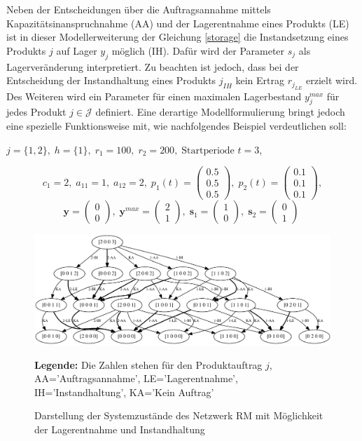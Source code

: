 Neben der Entscheidungen über die Auftragsannahme mittels Kapazitätsinanspruchnahme (AA) und der Lagerentnahme eines Produkts (LE) ist in dieser Modellerweiterung der Gleichung \eqref{storage} die Instandsetzung eines Produkts $j$ auf Lager $y_{j}$ möglich (IH). Dafür wird der Parameter $s_{j}$ als Lagerveränderung interpretiert. Zu beachten ist jedoch, dass bei der Entscheidung der Instandhaltung eines Produkts $j_{IH}$ kein Ertrag $r_{j_{LE}}$ erzielt wird. Des Weiteren wird ein Parameter für einen maximalen Lagerbestand $y_{j}^{max}$ für jedes Produkt $j\in\mathcal{J}$ definiert. Eine derartige Modellformulierung bringt jedoch eine spezielle Funktionsweise mit, wie nachfolgendes Beispiel verdeutlichen soll:
\begin{center}
$j = \{1, 2\}, \; h = \{1\}, \; r_{1} = 100, \; r_{2} = 200, \; \text{Startperiode } t=3$,
\end{center}
\[
    c_{1}=2, \;
    a_{11}=1, \;
     a_{12}=2, \;
     p_{1}(t)=\begin{pmatrix} 0.5\\ 0.5\\ 0.5  \end{pmatrix}, \;
     p_{2}(t)=\begin{pmatrix} 0.1\\ 0.1\\ 0.1  \end{pmatrix},
  \]
  \[
    \textbf{y}=\begin{pmatrix} 0 \\ 0 \end{pmatrix}, \;
    \textbf{y}^{max}=\begin{pmatrix} 2 \\ 1 \end{pmatrix}, \;
    \textbf{s}_1=\begin{pmatrix} 1 \\ 0 \end{pmatrix}, \;
     \textbf{s}_2=\begin{pmatrix} 0 \\ 1 \end{pmatrix} \;
  \]
\begin{figure}[h!]
  \begin{center}
    \includegraphics[width=130mm]{Bilder/Beispiel4.pdf}
    \caption{Darstellung der Systemzustände des Netzwerk RM mit Möglichkeit der Lagerentnahme und Instandhaltung}  \label{B4}
    {\footnotesize \textbf{Legende:} Die Zahlen stehen für den Produktauftrag $j$, AA='Auftragsannahme', LE='Lagerentnahme', IH='Instandhaltung', KA='Kein Auftrag'} 
  \end{center}
\end{figure}

